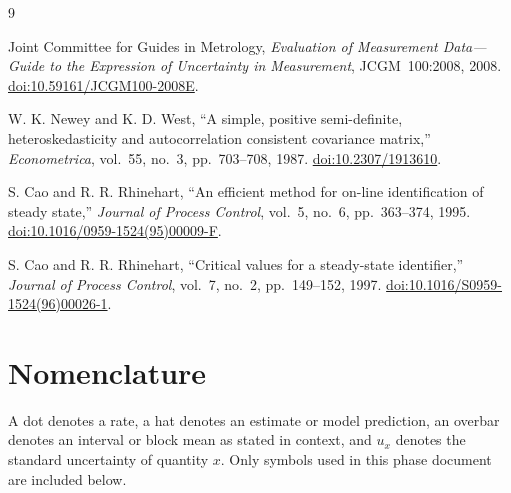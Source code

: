\documentclass[11pt]{article}
\begin{document}
\clearpage
{}
{\small
\begin{thebibliography}{9}
\setlength{\itemsep}{1.5pt}
\setlength{\parskip}{0pt}

Joint Committee for Guides in Metrology, \emph{Evaluation of Measurement Data---Guide to the Expression of Uncertainty in Measurement}, JCGM~100:2008, 2008. \href{https://doi.org/10.59161/JCGM100-2008E}{doi:10.59161/JCGM100-2008E}.

W. K. Newey and K. D. West, ``A simple, positive semi-definite, heteroskedasticity and autocorrelation consistent covariance matrix,'' \emph{Econometrica}, vol.~55, no.~3, pp.~703--708, 1987. \href{https://doi.org/10.2307/1913610}{doi:10.2307/1913610}.

S. Cao and R. R. Rhinehart, ``An efficient method for on-line identification of steady state,'' \emph{Journal of Process Control}, vol.~5, no.~6, pp.~363--374, 1995. \href{https://doi.org/10.1016/0959-1524(95)00009-F}{doi:10.1016/0959-1524(95)00009-F}.

S. Cao and R. R. Rhinehart, ``Critical values for a steady-state identifier,'' \emph{Journal of Process Control}, vol.~7, no.~2, pp.~149--152, 1997. \href{https://doi.org/10.1016/S0959-1524(96)00026-1}{doi:10.1016/S0959-1524(96)00026-1}.

\end{thebibliography}
}




\clearpage
\appendix
\section{Nomenclature}
\label{sec:nomenclature}
A dot denotes a rate, a hat denotes an estimate or model prediction, an overbar denotes an interval or block mean as stated in context, and $u_x$ denotes the standard uncertainty of quantity $x$. Only symbols used in this phase document are included below.
\end{document}
